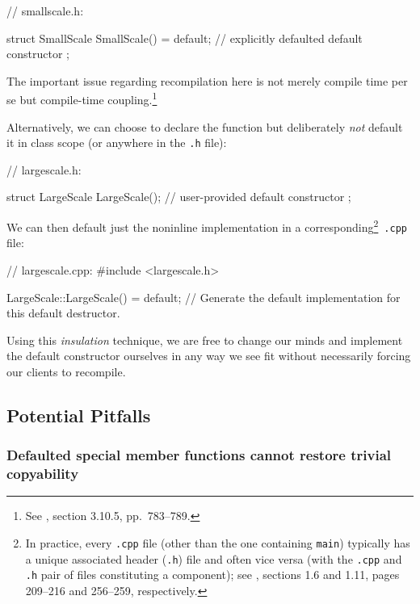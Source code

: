 \begin{emcppslisting}
// smallscale.h:

struct SmallScale
{
    SmallScale() = default;  // explicitly defaulted default constructor
};
\end{emcppslisting}

\noindent The important issue regarding recompilation here is not merely compile time per se but compile-time coupling.{\cprotect\footnote{See
  \cite{lakos20}, section 3.10.5, pp.~783--789.}}

Alternatively, we can choose to declare the function but deliberately
\emph{not} default it in class scope (or anywhere in the \lstinline!.h!
file):

\begin{emcppslisting}[emcppsbatch=e4]
// largescale.h:

struct LargeScale
{
    LargeScale();  // user-provided default constructor
};
\end{emcppslisting}

\noindent We can then default just the noninline implementation in a
corresponding{\cprotect\footnote{In practice, every \lstinline!.cpp! file
(other than the one containing \lstinline!main!) typically has a unique
associated header (\lstinline!.h!) file and often vice versa  (with the \lstinline!.cpp! and \lstinline!.h! pair of files constituting a component); see \cite{lakos20}, sections 1.6 and 1.11,
  pages 209--216 and 256--259, respectively.}}~\lstinline!.cpp! file:

\begin{emcppslisting}[emcppsbatch=e4]
// largescale.cpp:
#include <largescale.h>

LargeScale::LargeScale() = default;
    // Generate the default implementation for this default destructor.
\end{emcppslisting}

\noindent Using this \emph{insulation} technique, we are free to change our minds
and implement the default constructor ourselves in any way we see fit
without necessarily forcing our clients to recompile.

\subsection[Potential Pitfalls]{Potential Pitfalls}\label{potential-pitfalls}

\subsubsection[Defaulted special member functions cannot restore trivial copyability]{Defaulted special member functions cannot restore trivial copyability}

